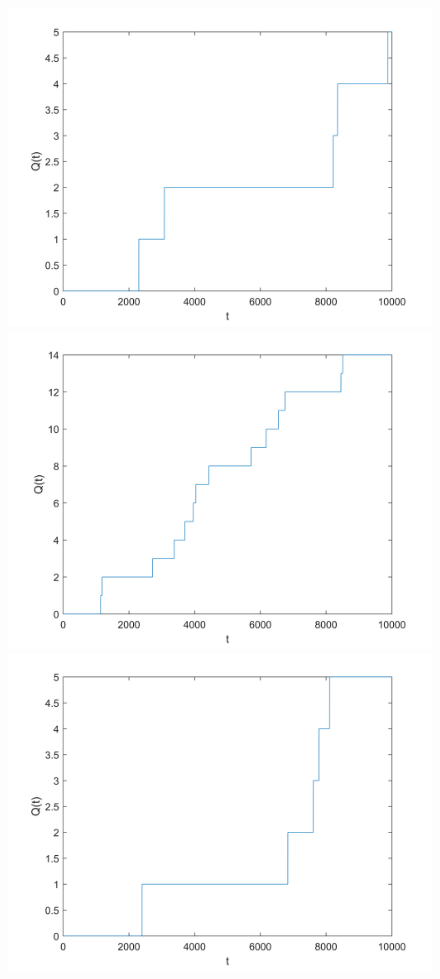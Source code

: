 \begin{figure}[!ht]
\begin{centering}
\includegraphics[scale=0.55]{Imagenes/Q1.png}
\includegraphics[scale=0.55]{Imagenes/Q2.png}
\includegraphics[scale=0.55]{Imagenes/Q3.png}

\end{centering}
\end{figure}
